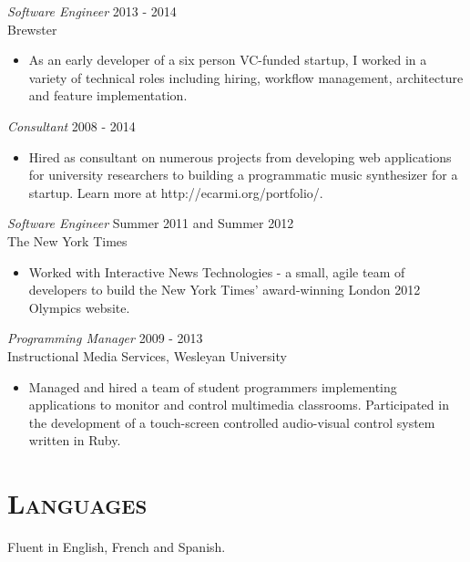 \documentclass[margin]{res}
\begin{document}
\begin{resume}
    {\sl Software Engineer} \hfill 2013 - 2014 \\ Brewster
    \begin{itemize}  \itemsep -2pt %
        \item As an early developer of a six person VC-funded startup, I worked in a variety of technical roles including hiring, workflow management, architecture and feature implementation.
    \end{itemize}

    {\sl Consultant} \hfill 2008 - 2014
    \begin{itemize}  \itemsep -2pt %
        \item Hired as consultant on numerous projects from developing web applications for university researchers to building a programmatic music synthesizer for a startup. Learn more at http://ecarmi.org/portfolio/.
    \end{itemize}

    {\sl Software Engineer} \hfill Summer 2011 and Summer 2012 \\
    The New York Times
    \begin{itemize}  \itemsep -2pt %
        \item Worked with Interactive News Technologies - a small, agile team of developers to build the New York Times' award-winning London 2012 Olympics website.
    \end{itemize}

    {\sl Programming Manager} \hfill 2009 - 2013 \\
    Instructional Media Services, Wesleyan University
    \begin{itemize}  \itemsep -2pt %
        \item Managed and hired a team of student programmers implementing applications to monitor and control multimedia classrooms. Participated in the development of a touch-screen controlled audio-visual control system written in Ruby.
    \end{itemize}

\section{\textsc{Languages}} Fluent in English, French and Spanish.

\end{resume}
\end{document}
